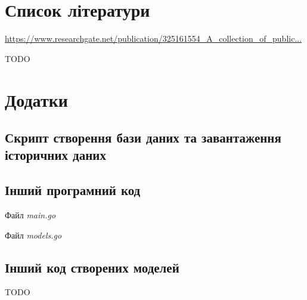 \documentclass[oneside,14pt]{extarticle}
\begin{document}
\newpage

\section{Список літератури}
\href{https://www.researchgate.net/publication/325161554_A_collection_of_public_transport_network_data_sets_for_25_cities}{https://www.researchgate.net/publication/325161554\_A\_collection\_of\_public...}

TODO

\newpage

\section{Додатки}
\subsection{Скрипт створення бази даних та завантаження історичних даних}
{\fontsize{8pt}{8pt}\selectfont}

\subsection{Інший програмний код}
Файл \textit{main.go}
{\fontsize{8pt}{8pt}\selectfont}

Файл \textit{models.go}
{\fontsize{8pt}{8pt}\selectfont}

\subsection{Інший код створених моделей}
TODO
\end{document}

